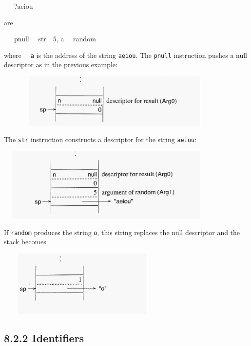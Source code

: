 {\ttfamily\mdseries
\ \ \ ?{\textquotedbl}aeiou{\textquotedbl}}

\noindent are

{\ttfamily\mdseries
\ \ \ pnull\newline
 \ \ str\ \ 5, a\newline
 \ \ random}

\noindent where \texttt{\ \ a} is the address of the string
\texttt{{\textquotedbl}aeiou{\textquotedbl}}. The \texttt{pnull}
instruction pushes a null descriptor as in the previous example:

\ \  \ \ \ \ \  \includegraphics[width=3.7402in,height=1.0575in]{ib-img/ib-img042.jpg} 

The \texttt{str} instruction constructs a descriptor for the string
\texttt{{\textquotedbl}aeiou{\textquotedbl}}:

\ \  \includegraphics[width=4.0602in,height=1.4398in]{ib-img/ib-img045.jpg} 

If \texttt{random} produces the string
\texttt{{\textquotedbl}o{\textquotedbl}}, this string replaces the
null descriptor and the stack becomes

\ \ \ \  \includegraphics[width=2.778in,height=1.3047in]{ib-img/ib-img046.jpg} 

\subsection[8.2.2 Identifiers]{8.2.2 Identifiers}

